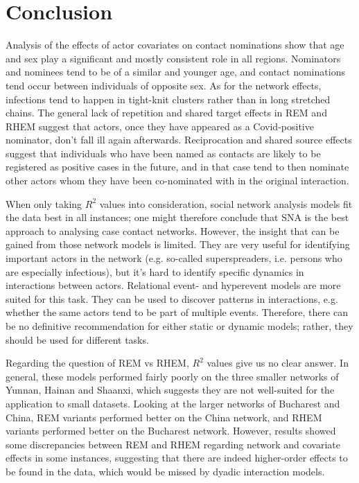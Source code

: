 \section{Conclusion}

Analysis of the effects of actor covariates on contact nominations show that age and sex play a significant and mostly consistent role in all regions. Nominators and nominees tend to be of a similar and younger age, and contact nominations tend occur between individuals of opposite sex. As for the network effects, infections tend to happen in tight-knit clusters rather than in long stretched chains. The general lack of repetition and shared target effects in REM and RHEM suggest that actors, once they have appeared as a Covid-positive nominator, don't fall ill again afterwards. Reciprocation and shared source effects suggest that individuals who have been named as contacts are likely to be registered as positive cases in the future, and in that case tend to then nominate other actors whom they have been co-nominated with in the original interaction. 

When only taking $R^2$ values into consideration, social network analysis models fit the data best in all instances; one might therefore conclude that SNA is the best approach to analysing case contact networks. However, the insight that can be gained from those network models is limited. They are very useful for identifying important actors in the network (e.g. so-called superspreaders, i.e. persons who are especially infectious), but it's hard to identify specific dynamics in interactions between actors. Relational event- and hyperevent models are more suited for this task. They can be used to discover patterns in interactions, e.g. whether the same actors tend to be part of multiple events. Therefore, there can be no definitive recommendation for either static or dynamic models; rather, they should be used for different tasks. 

Regarding the question of REM vs RHEM, $R^2$ values give us no clear answer. In general, these models performed fairly poorly on the three smaller networks of Yunnan, Hainan and Shaanxi, which suggests they are not well-suited for the application to small datasets. Looking at the larger networks of Bucharest and China, REM variants performed better on the China network, and RHEM variants performed better on the Bucharest network. However, results showed some discrepancies between REM and RHEM regarding network and covariate effects in some instances, suggesting that there are indeed higher-order effects to be found in the data, which would be missed by dyadic interaction models. 